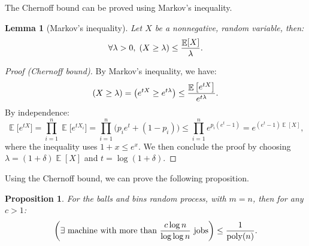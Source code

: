 \documentclass[11pt]{article}
\DeclareMathOperator*{\E}{\mathbb{E}}
\let\Pr\relax
\DeclareMathOperator*{\Pr}{\mathbb{P}}
\newtheorem{lemma}[theorem]{Lemma}
\newtheorem{proposition}[theorem]{Proposition}
\theoremstyle{definition}
\begin{document}
The Chernoff bound can be proved using Markov's inequality.

\begin{lemma}[Markov's inequality]
    Let $X$ be a nonnegative, random variable, then:
    \begin{displaymath}
        \forall\lambda > 0,\; \Pr (X\geq\lambda)\leq \frac{\E[X]}{\lambda}.
    \end{displaymath}
\end{lemma}

\begin{proof}[Proof (Chernoff bound)]
    By Markov's inequality, we have:
    \begin{displaymath}
        \Pr (X \geq \lambda) = \Pr\big(e^{tX} \geq
        e^{t\lambda}\big)\leq\frac{\E\big[e^{tX}\big]}{e^{t\lambda}}.
    \end{displaymath}
    By independence:
    \begin{displaymath}
        \E\big[e^{tX}\big] = \prod_{i=1}^n\E\big[e^{tX_i}\big]
        =\prod_{i=1}^n\big(p_ie^t+(1-p_i)\big)
        \leq\prod_{i=1}^ne^{p_i(e^t-1)} = e^{(e^t-1)\E[X]},
    \end{displaymath}
    where the inequality uses $1+x\leq e^x$. We then conclude the proof by
    choosing $\lambda = (1+\delta)\E[X]$ and $t=\log(1+\delta)$.
\end{proof}

Using the Chernoff bound, we can prove the following proposition.

\begin{proposition}
    For the balls and bins random process, with $m=n$, then for any $c > 1$:
    \begin{displaymath}
        \Pr\left(\exists \text{ machine with more than $\frac{c\log n}{\log\log
            n}$ jobs}\right)
            \leq \frac{1}{\mathrm{poly}(n)}.
    \end{displaymath}
\end{proposition}
\end{document}
